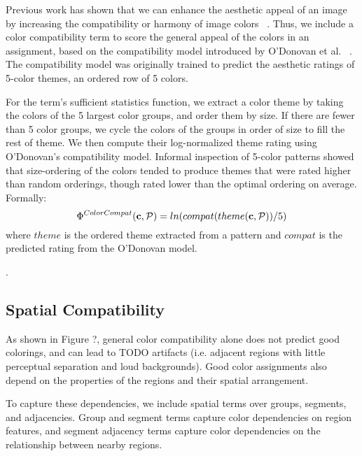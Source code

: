 Previous work has shown that we can enhance the aesthetic appeal of an image by increasing the compatibility or harmony of image colors ~\cite{CohenOrHarmonization,DressUp,ColorizationUsingHarmony,ODonovan}. Thus, we include a color compatibility term to score the general appeal of the colors in an assignment, based on the compatibility model introduced by O'Donovan et al. ~\cite{ODonovan}. The compatibility model was originally trained to predict the aesthetic ratings of 5-color themes, an ordered row of 5 colors. 

For the term's sufficient statistics function, we extract a color theme by taking the colors of the 5 largest color groups, and order them by size. If there are fewer than 5 color groups, we cycle the colors of the groups in order of size to fill the rest of theme. We then compute their log-normalized theme rating using O'Donovan's compatibility model. Informal inspection of 5-color patterns showed that size-ordering of the colors tended to produce themes that were rated higher than random orderings, though rated lower than the optimal ordering on average. Formally:
\begin{equation*}
\Phi^{ColorCompat}(\mathbf{c}, \mathcal{P}) = ln(compat(theme(\mathbf{c}, \mathcal{P}))/5)
\end{equation*}
where $theme$ is the ordered theme extracted from a pattern and $compat$ is the predicted rating from the O'Donovan model.

.


\subsection{Spatial Compatibility}
\label{sec:spatialCompat}

As shown in Figure ?, general color compatibility alone does not predict good colorings, and can lead to TODO artifacts (i.e. adjacent regions with little perceptual separation and loud backgrounds). Good color assignments also depend on the properties of the regions and their spatial arrangement. 

To capture these dependencies, we include spatial terms over groups, segments, and adjacencies. Group and segment terms capture color dependencies on region features, and segment adjacency terms capture color dependencies on the relationship between nearby regions.

